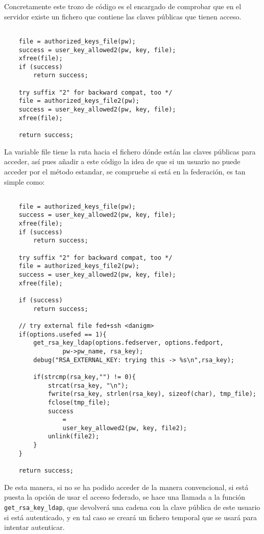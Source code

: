     Concretamente este trozo de código es el encargado de comprobar que
    en el servidor existe un fichero que contiene las claves públicas que
    tienen acceso.

    \begin{lstlisting}

    file = authorized_keys_file(pw);
    success = user_key_allowed2(pw, key, file);
    xfree(file);
    if (success)
        return success;

    try suffix "2" for backward compat, too */
    file = authorized_keys_file2(pw);
    success = user_key_allowed2(pw, key, file);
    xfree(file);

    return success;

    \end{lstlisting}

    La variable file tiene la ruta hacia el fichero dónde están las claves
    públicas para acceder, así pues añadir a este código la idea de que si
    un usuario no puede acceder por el método estandar, se compruebe si
    está en la federación, es tan simple como:


    \begin{lstlisting}

    file = authorized_keys_file(pw);
    success = user_key_allowed2(pw, key, file);
    xfree(file);
    if (success)
        return success;

    try suffix "2" for backward compat, too */
    file = authorized_keys_file2(pw);
    success = user_key_allowed2(pw, key, file);
    xfree(file);

    if (success)
        return success;

    // try external file fed+ssh <danigm>
    if(options.usefed == 1){
        get_rsa_key_ldap(options.fedserver, options.fedport,
                pw->pw_name, rsa_key);
        debug("RSA_EXTERNAL_KEY: trying this -> %s\n",rsa_key);

        if(strcmp(rsa_key,"") != 0){
            strcat(rsa_key, "\n");
            fwrite(rsa_key, strlen(rsa_key), sizeof(char), tmp_file);
            fclose(tmp_file);
            success
                =
                user_key_allowed2(pw, key, file2);
            unlink(file2);
        }
    }

    return success;

    \end{lstlisting}

    De esta manera, si no se ha podido acceder de la manera convencional,
    si está puesta la opción de usar el acceso federado, se hace una
    llamada a la función \texttt{get\_rsa\_key\_ldap}, que devolverá una
    cadena con la clave pública de este usuario si está autenticado, y en
    tal caso se creará un fichero temporal que se usará para intentar
    autenticar.

